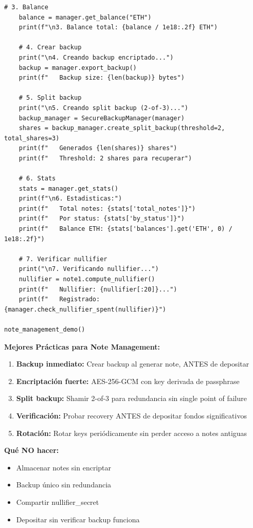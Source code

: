\documentclass[11pt,a4paper,twoside]{book}
\theoremstyle{definition}
\theoremstyle{remark}
\begin{document}
\begin{lstlisting}[style=python, caption={Sistema completo de gestión de notes}]
    # 3. Balance
    balance = manager.get_balance("ETH")
    print(f"\n3. Balance total: {balance / 1e18:.2f} ETH")
    
    # 4. Crear backup
    print("\n4. Creando backup encriptado...")
    backup = manager.export_backup()
    print(f"   Backup size: {len(backup)} bytes")
    
    # 5. Split backup
    print("\n5. Creando split backup (2-of-3)...")
    backup_manager = SecureBackupManager(manager)
    shares = backup_manager.create_split_backup(threshold=2, total_shares=3)
    print(f"   Generados {len(shares)} shares")
    print(f"   Threshold: 2 shares para recuperar")
    
    # 6. Stats
    stats = manager.get_stats()
    print(f"\n6. Estadisticas:")
    print(f"   Total notes: {stats['total_notes']}")
    print(f"   Por status: {stats['by_status']}")
    print(f"   Balance ETH: {stats['balances'].get('ETH', 0) / 1e18:.2f}")
    
    # 7. Verificar nullifier
    print("\n7. Verificando nullifier...")
    nullifier = note1.compute_nullifier()
    print(f"   Nullifier: {nullifier[:20]}...")
    print(f"   Registrado: {manager.check_nullifier_spent(nullifier)}")

note_management_demo()
\end{lstlisting}

\begin{keyidea}
\textbf{Mejores Prácticas para Note Management:}

\begin{enumerate}
    \item \textbf{Backup inmediato:} Crear backup al generar note, ANTES de depositar
    \item \textbf{Encriptación fuerte:} AES-256-GCM con key derivada de passphrase
    \item \textbf{Split backup:} Shamir 2-of-3 para redundancia sin single point of failure
    \item \textbf{Verificación:} Probar recovery ANTES de depositar fondos significativos
    \item \textbf{Rotación:} Rotar keys periódicamente sin perder acceso a notes antiguas
\end{enumerate}

\textbf{Qué NO hacer:}
\begin{itemize}
    \item Almacenar notes sin encriptar
    \item Backup único sin redundancia
    \item Compartir nullifier\_secret
    \item Depositar sin verificar backup funciona
\end{itemize}
\end{keyidea}
\end{document}
